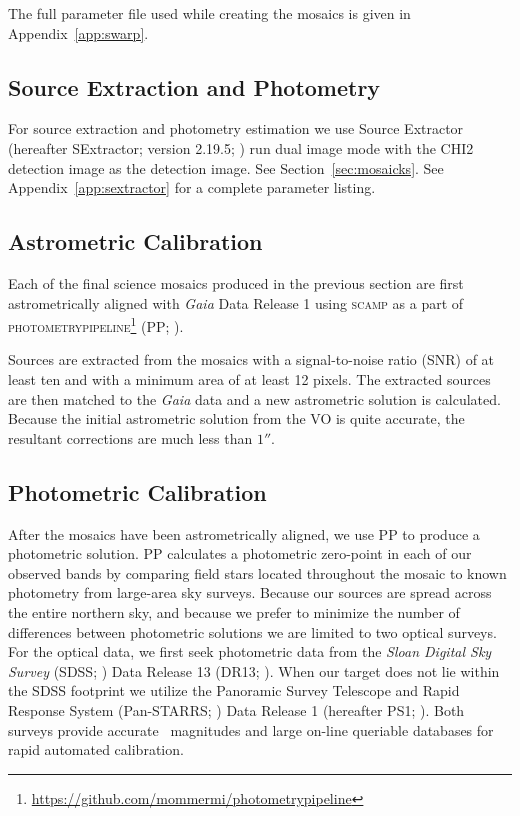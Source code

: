 \documentclass[apj, revtex4-1]{emulateapj}
\begin{document}

The full parameter file used while creating the mosaics is given in Appendix~\ref{app:swarp}.

\subsection{Source Extraction and Photometry}
For source extraction and photometry estimation we use Source Extractor (hereafter SExtractor; version 2.19.5; \citealt{Bertin1996}) run dual image mode with the CHI2 detection image as the detection image. See Section~\ref{sec:mosaicks}. See Appendix~\ref{app:sextractor} for a complete parameter listing.

\subsection{Astrometric Calibration}
Each of the final science mosaics produced in the previous section are first astrometrically aligned with \textit{Gaia} \citep{GaiaCollaboration2016} Data Release 1 \citep{GaiaCollaboration2016a} using \textsc{scamp} \citep{Bertin2006} as a part of \textsc{photometrypipeline}\footnote{\url{https://github.com/mommermi/photometrypipeline}} (PP; \citealt{Mommert2017}).

Sources are extracted from the mosaics with a signal-to-noise ratio (SNR) of at least ten and with a minimum area of at least 12 pixels. The extracted sources are then matched to the \textit{Gaia} data and a new astrometric solution is calculated. Because the initial astrometric solution from the VO is quite accurate, the resultant corrections are much less than $1''$.

\subsection{Photometric Calibration}
After the mosaics have been astrometrically aligned, we use PP to produce a photometric solution. PP calculates a photometric zero-point in each of our observed bands by comparing field stars located throughout the mosaic to known photometry from large-area sky surveys. Because our sources are spread across the entire northern sky, and because we prefer to minimize the number of differences between photometric solutions we are limited to two optical surveys. For the optical data, we first seek photometric data from the \textit{Sloan Digital Sky Survey} (SDSS; \citealt{York2000}) Data Release 13 (DR13; \citealt{Albareti2017}). When our target does not lie within the SDSS footprint we utilize the Panoramic Survey Telescope and Rapid Response System (Pan-STARRS; \citealt{Chambers2016}) Data Release 1 (hereafter PS1; \citealt{Flewelling2016}). Both surveys provide accurate \sdssg\sdssr\sdssi\sdssz\ magnitudes and large on-line queriable databases for rapid automated calibration.
\end{document}
